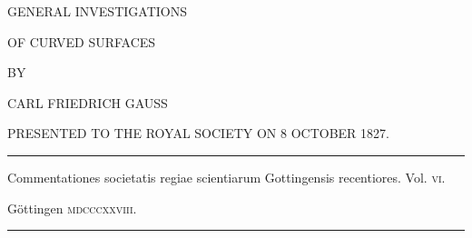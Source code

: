 \clearpage
{}
\thispagestyle{empty}
\vspace*{.5in}
\begin{center}
{\large GENERAL INVESTIGATIONS}\par\bigskip
{\Large OF CURVED SURFACES}\par\vspace{50pt}
BY\par\vspace{55pt}
{\large CARL FRIEDRICH GAUSS}\par\vspace{45pt}
{\small PRESENTED TO THE ROYAL SOCIETY ON 8 OCTOBER 1827.}
\end{center}
\vfill
\begin{center}
\rule{.8\linewidth}{.3pt}\par\smallskip
\small Commentationes societatis regiae scientiarum Gottingensis recentiores. Vol. \textsc{vi}.\par
Göttingen \textsc{mdcccxxviii}.\par\smallskip
\rule{.8\linewidth}{.3pt}
\end{center}
\clearpage

